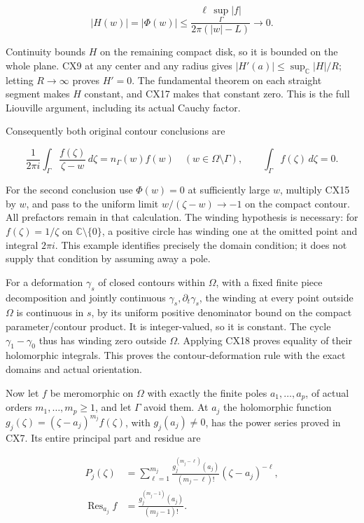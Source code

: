 \documentclass[
  11pt,
]{article}
\begin{document}
\[
|H(w)|=|\Phi(w)|
\leq \frac{\ell\,\sup_\Gamma|f|}{2\pi(|w|-L)}
\longrightarrow0.
\tag{CX17}
\]

Continuity bounds \(H\) on the remaining compact disk, so it is bounded
on the whole plane. CX9 at any center and any radius gives
\(|H'(a)|\leq \sup_{\mathbb C}|H|/R\); letting \(R\to\infty\) proves
\(H'=0\). The fundamental theorem on each straight segment makes \(H\)
constant, and CX17 makes that constant zero. This is the full Liouville
argument, including its actual Cauchy factor.

Consequently both original contour conclusions are

\[
\frac1{2\pi i}\int_\Gamma\frac{f(\zeta)}{\zeta-w}\,d\zeta
       =n_\Gamma(w)f(w)\quad(w\in\Omega\setminus\Gamma),
\qquad
\int_\Gamma f(\zeta)\,d\zeta=0 .
\tag{CX18}
\]

For the second conclusion use \(\Phi(w)=0\) at sufficiently large \(w\),
multiply CX15 by \(w\), and pass to the uniform limit
\(w/(\zeta-w)\to-1\) on the compact contour. All prefactors remain in
that calculation. The winding hypothesis is necessary: for
\(f(\zeta)=1/\zeta\) on \(\mathbb C\setminus\{0\}\), a positive circle
has winding one at the omitted point and integral \(2\pi i\). This
example identifies precisely the domain condition; it does not supply
that condition by assuming away a pole.

For a deformation \(\gamma_s\) of closed contours within \(\Omega\),
with a fixed finite piece decomposition and jointly continuous
\(\gamma_s,\partial_t\gamma_s\), the winding at every point outside
\(\Omega\) is continuous in \(s\), by its uniform positive denominator
bound on the compact parameter/contour product. It is integer-valued, so
it is constant. The cycle \(\gamma_1-\gamma_0\) thus has winding zero
outside \(\Omega\). Applying CX18 proves equality of their holomorphic
integrals. This proves the contour-deformation rule with the exact
domains and actual orientation.

Now let \(f\) be meromorphic on \(\Omega\) with exactly the finite poles
\(a_1,\ldots,a_p\), of actual orders \(m_1,\ldots,m_p\geq1\), and let
\(\Gamma\) avoid them. At \(a_j\) the holomorphic function
\(g_j(\zeta)=(\zeta-a_j)^{m_j}f(\zeta)\), with \(g_j(a_j)\ne0\), has the
power series proved in CX7. Its entire principal part and residue are

\[
\begin{aligned}
P_j(\zeta)&=\sum_{\ell=1}^{m_j}
        \frac{g_j^{(m_j-\ell)}(a_j)}{(m_j-\ell)!}
                         (\zeta-a_j)^{-\ell},\\
\operatorname{Res}_{a_j}f
 &=\frac{g_j^{(m_j-1)}(a_j)}{(m_j-1)!}.
\end{aligned}
\tag{CX19}
\]
\end{document}

